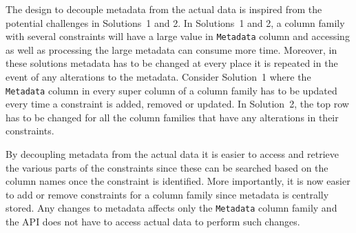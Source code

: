 The design to decouple metadata from the actual data is inspired from the
potential challenges in Solutions~1 and 2. 
In Solutions~1 and 2,   a column family with several constraints will have a
large value in \texttt{Metadata} column and accessing as well as processing the
large metadata can consume more time.  Moreover,  in these solutions metadata has
to be changed at every place it is repeated in the event of any alterations to
the metadata. 
Consider Solution~1 where the \texttt{Metadata} column in every super column
of a column family has to be updated every time a constraint is added,  removed
or updated. 
In Solution~2,  the top row has to be changed for all the column families that have
any alterations  in their constraints.   

By decoupling metadata from the actual
data it is  easier to access and retrieve the various parts of the constraints
since these can be searched based on the column names once the constraint is
identified. 
More importantly,  it is now easier to add or remove constraints for a column
family since metadata  is centrally stored.  Any changes to metadata affects
only the \texttt{Metadata} column family and the \ac{API} does not have to access actual
data to perform such changes. 
